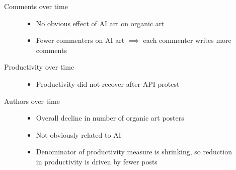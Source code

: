\documentclass[aspectratio=169]{beamer}
\def\defaultscalefig{0.4}
\begin{document}
\begin{frame}{Comments over time}
	\begin{figure}
		\begin{minipage}{0.45\textwidth}
			\centering
		\end{minipage}\hfill
		\begin{minipage}{0.45\textwidth}
			\centering
			\begin{itemize}
				\item No obvious effect of AI art on organic art
				\item Fewer commenters on AI art
					$\implies$ each commenter writes more comments
			\end{itemize}
		\end{minipage}
	\end{figure}
\end{frame}

\begin{frame}{Productivity over time}
	\begin{figure}
		\begin{minipage}{0.45\textwidth}
			\centering
		\end{minipage}\hfill
		\begin{minipage}{0.45\textwidth}
			\centering
			\begin{itemize}
				\item Productivity did not recover after API protest
			\end{itemize}
		\end{minipage}
	\end{figure}
\end{frame}

\begin{frame}{Authors over time}
	\begin{figure}
		\begin{minipage}{0.45\textwidth}
			\centering
		\end{minipage}\hfill
		\begin{minipage}{0.45\textwidth}
			\centering
			\begin{itemize}
				\item Overall decline in number of organic art posters
				\item Not obviously related to AI
				\item Denominator of productivity measure is shrinking,
					so reduction in productivity is driven by fewer posts
			\end{itemize}
		\end{minipage}
	\end{figure}
\end{frame}
\end{document}
